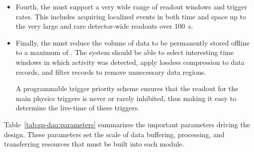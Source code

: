\begin{itemize}
\item Fourth, the  must support a very wide range of readout windows and trigger rates. This includes acquiring localized events in both time and space up to the very large and rare  detector-wide readouts over \SI{100}{s}.

\item Finally, the  must reduce the volume of data to be permanently stored offline to a maximum of \offsitepbpy.
  The  system should be able to select interesting time windows in which activity was detected, apply lossless compression to data records, and filter records to remove unnecessary data regions.

A programmable trigger priority scheme ensures that the readout for the main physics triggers is never or rarely inhibited, thus making it easy to determine the live-time of these triggers. 


\end{itemize}

Table~\ref{tab:sp-daq:parameters} summarizes the important parameters driving the  design. These parameters set the scale of data buffering, processing, and transferring resources that must be built into each  module. 

